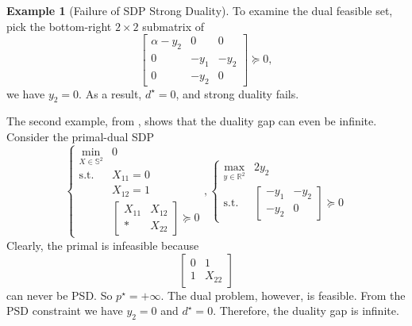 \documentclass[
]{book}
\theoremstyle{definition}
\theoremstyle{definition}
\newtheorem{example}{Example}[chapter]
\theoremstyle{definition}
\theoremstyle{definition}
\theoremstyle{remark}
\begin{document}
\begin{example}[Failure of SDP Strong Duality]
To examine the dual feasible set, pick the bottom-right \(2 \times 2\) submatrix of
\[
\begin{bmatrix} \alpha - y_2 & 0 & 0 \\ 0 & - y_1 & -y_2 \\ 0 & -y_2 & 0 \end{bmatrix} \succeq 0,
\]
we have \(y_2 = 0\). As a result, \(d^\star = 0\), and strong duality fails.

The second example, from \citep{todd01an-semidefinite}, shows that the duality gap can even be infinite. Consider the primal-dual SDP
\[
\begin{cases}
\min_{X \in \mathbb{S}^{2}} & 0 \\
\mathrm{s.t.}& X_{11} = 0 \\
& X_{12} = 1 \\
& \begin{bmatrix} X_{11} & X_{12} \\ * & X_{22} \end{bmatrix} \succeq 0
\end{cases},
\begin{cases}
\max_{y \in \mathbb{R}^{2}} & 2 y_2 \\
\mathrm{s.t.}& \begin{bmatrix} - y_1 & - y_2 \\ - y_2 & 0 \end{bmatrix} \succeq 0 
\end{cases}
\]
Clearly, the primal is infeasible because
\[
\begin{bmatrix} 0 & 1 \\ 1 & X_{22} \end{bmatrix}
\]
can never be PSD. So \(p^\star = + \infty\). The dual problem, however, is feasible. From the PSD constraint we have \(y_2 = 0\) and \(d^\star = 0\). Therefore, the duality gap is infinite.


\end{example}
\end{document}
